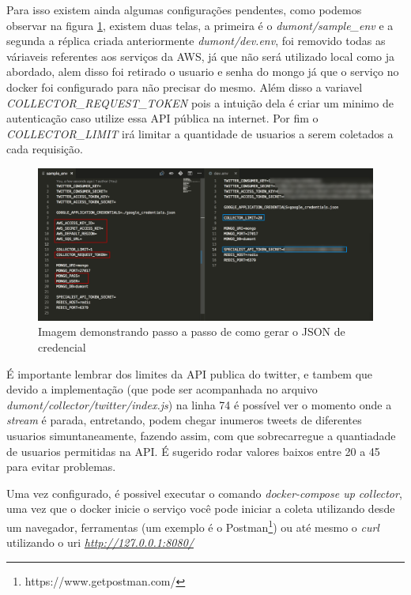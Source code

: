 Para isso existem ainda algumas configurações pendentes, como podemos observar na figura \ref{fig:creds}, existem duas telas, a primeira é o \textit{dumont/sample\_env} e a segunda a réplica criada anteriormente \textit{dumont/dev.env}, foi removido todas as váriaveis referentes aos serviços da AWS, já que não será utilizado local como ja abordado, alem disso foi retirado o usuario e senha do mongo já que o serviço no docker foi configurado para não precisar do mesmo. Além disso a variavel \textit{COLLECTOR\_REQUEST\_TOKEN} pois a intuição dela é criar um minimo de autenticação caso utilize essa API pública na internet. Por fim o \textit{COLLECTOR\_LIMIT} irá limitar a quantidade de usuarios a serem coletados a cada requisição.

\begin{figure}
    \centering
    \includegraphics[width=1\textwidth]{imagens/creds.png}
    \caption{Imagem demonstrando passo a passo de como gerar o JSON de credencial}
    \label{fig:creds}
\end{figure}

É importante lembrar dos limites da API publica do twitter, e tambem que devido a implementação (que pode ser acompanhada no arquivo \textit{dumont/collector/twitter/index.js}) na linha 74 é possível ver o momento onde a \textit{stream} é parada, entretando, podem chegar inumeros tweets de diferentes usuarios simuntaneamente, fazendo assim, com que sobrecarregue a quantiadade de usuarios permitidas na API. É sugerido rodar valores baixos entre 20 a 45 para evitar problemas.

Uma vez configurado, é possivel executar o comando \textit{docker-compose up collector}, uma vez que o docker inicie o serviço você pode iniciar a coleta utilizando desde um navegador, ferramentas (um exemplo é o Postman\footnote{https://www.getpostman.com/}) ou até mesmo o \textit{curl} utilizando o uri \textit{\url{http://127.0.0.1:8080/}}